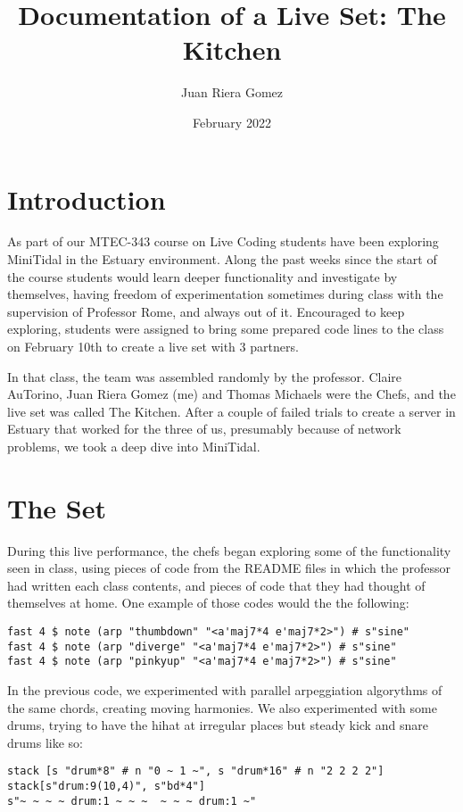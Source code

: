 \documentclass{article}
\title{Documentation of a Live Set: The Kitchen}
\author{Juan Riera Gomez}
\date{February 2022}
\begin{document}
\maketitle
\section{Introduction}
As part of our MTEC-343 course on Live Coding students have been exploring MiniTidal in the Estuary environment. Along the past weeks since the start of the course students would learn deeper functionality and investigate by themselves, having freedom of experimentation sometimes during class with the supervision of Professor Rome, and always out of it. Encouraged to keep exploring, students were assigned to bring some prepared code lines to the class on February 10th to create a live set with 3 partners.

In that class, the team was assembled randomly by the professor. Claire AuTorino, Juan Riera Gomez (me) and Thomas Michaels were the Chefs, and the live set was called The Kitchen. After a couple of failed trials to create a server in Estuary that worked for the three of us, presumably because of network problems, we took a deep dive into MiniTidal.

\section{The Set}
During this live performance, the chefs began exploring some of the functionality seen in class, using pieces of code from the README files in which the professor had written each class contents, and pieces of code that they had thought of themselves at home. One example of those codes would the the following:

\begin{verbatim}
fast 4 $ note (arp "thumbdown" "<a'maj7*4 e'maj7*2>") # s"sine"
fast 4 $ note (arp "diverge" "<a'maj7*4 e'maj7*2>") # s"sine"
fast 4 $ note (arp "pinkyup" "<a'maj7*4 e'maj7*2>") # s"sine"
\end{verbatim}

In the previous code, we experimented with parallel arpeggiation algorythms of the same chords, creating moving harmonies. We also experimented with some drums, trying to have the hihat at irregular places but steady kick and snare drums like so:

\begin{verbatim}
stack [s "drum*8" # n "0 ~ 1 ~", s "drum*16" # n "2 2 2 2"]
stack[s"drum:9(10,4)", s"bd*4"]
s"~ ~ ~ ~ drum:1 ~ ~ ~  ~ ~ ~ drum:1 ~"
\end{verbatim}
\end{document}
